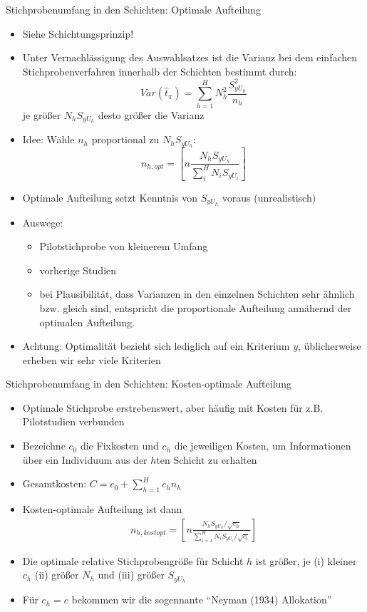 \documentclass[9pt]{beamer}
\begin{document}
\begin{frame}{Stichprobenumfang in den Schichten: Optimale Aufteilung}
\begin{itemize}
	\item Siehe Schichtungsprinzip!
	\item Unter Vernachlässigung des Auswahlsatzes ist die Varianz bei dem einfachen Stichprobenverfahren innerhalb der Schichten bestimmt durch:
	$$Var(\hat{t}_\pi) = \sum_{h=1}^H N_h^2 \frac{S_{yU_h}^2}{n_h}$$
	je größer $N_h S_{yU_h}$ desto größer die Varianz
	\item Idee: Wähle $n_h$ proportional zu $N_h S_{yU_h}$:
	$$n_{h,opt}=\left[n \frac{N_h S_{yU_h}}{\sum_{i}^H N_i S_{yU_i}}\right]$$
	\item Optimale Aufteilung setzt Kenntnis von $S_{yU_h}$ voraus (unrealistisch)
	\item Auswege: 
	\begin{itemize}
		\item Pilotstichprobe von kleinerem Umfang
		\item vorherige Studien
		\item bei Plausibilität, dass Varianzen in den einzelnen Schichten sehr ähnlich bzw. gleich sind, entspricht die proportionale Aufteilung annähernd der optimalen Aufteilung.
	\end{itemize}
	\item Achtung: Optimalität bezieht sich lediglich auf ein Kriterium $y$, üblicherweise erheben wir sehr viele Kriterien
\end{itemize}
\end{frame}

\begin{frame}{Stichprobenumfang in den Schichten: Kosten-optimale Aufteilung}
\begin{itemize}
	\item Optimale Stichprobe erstrebenswert, aber häufig mit Kosten für z.B. Pilotstudien verbunden
	\item Bezeichne $c_0$ die Fixkosten und $c_h$ die jeweiligen Kosten, um Informationen über ein Individuum aus der $h$ten Schicht zu erhalten
	\item Gesamtkosten: $C = c_0 + \sum_{h=1}^{H}c_h n_h$
	\item Kosten-optimale Aufteilung ist dann
	\begin{align*}
	n_{h,kostopt} = \left[n \frac{N_h S_{yU_h} /\sqrt{c_h}}{\sum_{i=1}^H N_i S_{yU_i}/\sqrt{c_i}}\right]
	\end{align*}
	\item Die optimale relative Stichprobengröße für Schicht $h$ ist größer, je (i) kleiner $c_h$ (ii) größer $N_h$ und (iii) größer $S_{yU_h}$
	\item Für $c_h=c$ bekommen wir die sogennante \enquote{Neyman (1934) Allokation}	
\end{itemize}
\end{frame}
\end{document}
